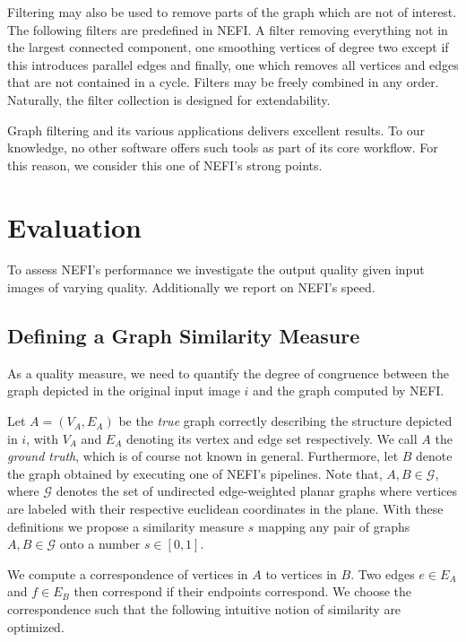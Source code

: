 		Filtering may also be used to remove parts of the graph which are not of interest. The following filters are predefined in NEFI. A filter removing everything not in the largest connected component, one smoothing vertices of degree two except if this introduces parallel edges and finally, one which removes all vertices and edges that are not contained in a cycle. Filters may be freely combined in any order. Naturally, the filter collection is designed for extendability.

		Graph filtering and its various applications delivers excellent results. To our knowledge, no other software offers such tools as part of its core workflow. For this reason, we consider this one of NEFI's strong points.

\section{Evaluation}

	To assess NEFI's performance we investigate the output quality given input images of varying quality. Additionally we report on NEFI's speed. 
 
	\subsection{Defining a Graph Similarity Measure}

		As a quality measure, we need to quantify the degree of congruence between the graph depicted in the original input image $i$ and the graph computed by NEFI.  

		Let $A = (V_A, E_A)$ be the \emph{true} graph correctly describing the structure depicted in $i$, with $V_A$ and $E_A$ denoting its vertex and edge set respectively. We call $A$ the \emph{ground truth}, which is of course not known in general. Furthermore, let $B$ denote the graph obtained by executing one of NEFI's pipelines. Note that, $A, B \in \mathcal{G}$, where $\mathcal{G}$ denotes the set of undirected edge-weighted planar graphs where vertices are labeled with their respective euclidean coordinates in the plane. With these definitions we propose a similarity measure $s$ mapping any pair of graphs $A,B \in \mathcal{G}$ onto a number $s \in [0,1]$. 

		We compute a correspondence of vertices in $A$ to vertices in $B$. Two edges $e \in E_A$ and $f \in E_B$ then correspond if their endpoints correspond. We choose the correspondence such that the following intuitive notion of similarity are optimized.

